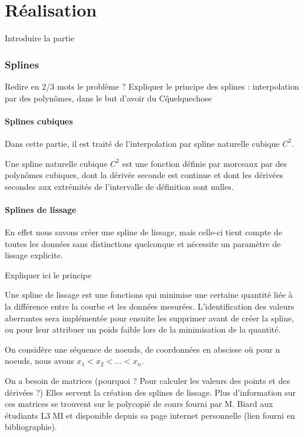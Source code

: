 \documentclass[a4paper,12pt]{article} %
\begin{document}
\renewcommand\partname{}
\part{Réalisation}
	Introduire la partie
	\section{Splines}
		Redire en 2/3 mots le problème ?
		Expliquer le principe des splines : interpolation par des polynômes, dans le but d'avoir du C\^quelquechose
		
		\subsection{Splines cubiques}

            Dans cette partie, il est traité de l'interpolation par spline naturelle cubique $C^{2}$.

            Une spline naturelle cubique $C^{2}$ est une fonction définie par morceaux par des polynômes cubiques, dont la dérivée seconde est continue et dont les dérivées secondes aux extrémités de l'intervalle de définition sont nulles. 

		\subsection{Splines de lissage}
		En effet nous savons créer une spline de lissage, mais celle-ci tient compte de toutes les données sans distinctions quelconque et nécessite un paramètre de lissage explicite.
		
			Expliquer ici le principe
			
			Une spline de lissage est une fonctions qui minimise une certaine quantité liée à la différence entre la courbe et les données mesurées. L'identification des valeurs aberrantes sera implémentée pour ensuite les supprimer avant de créer la spline, ou pour leur attribuer un poids faible lors de la minimisation de la quantité.
			 
			 On considère une séquence de noeuds,  de coordonnées en abscisse où pour n noeuds, nous avons $x_1 < x_2 < ... < x_n$.
			 
			 On a besoin de matrices (pourquoi ? Pour calculer les valeurs des points et des dérivées ?)
			 Elles servent la création des splines de lissage. Plus d'information sur ces matrices se trouvent sur le polycopié de cours fourni par M. Biard aux étudiants L3 MI et disponible depuis sa page internet personnelle (lien fourni en bibliographie).
			 
\end{document}
